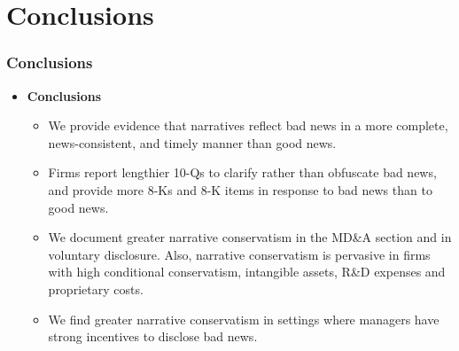 \documentclass{beamer}
\begin{document}
\section{Conclusions}
\begin{frame}
\frametitle{Conclusions}
\begin{itemize}
	\item \textbf{Conclusions}
	\begin{itemize}
		\item We provide evidence that narratives reflect bad news in a more complete, news-consistent, and timely manner than good news. 
		\item Firms report lengthier 10-Qs to clarify rather than obfuscate bad news, and provide more 8-Ks and 8-K items in response to bad news than to good news.
		\item We document greater narrative conservatism in the MD\&A section and in voluntary disclosure. Also, narrative conservatism is pervasive in firms with high conditional conservatism, intangible assets, R\&D expenses and proprietary costs.
		\item We find greater narrative conservatism in settings where managers have strong incentives to disclose bad news.
	\end{itemize}


	
\end{itemize}

\end{frame}
\end{document}
